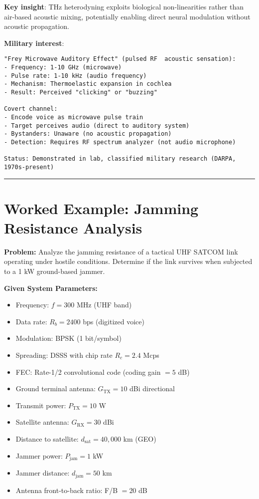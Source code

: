 \textbf{Key insight}: THz heterodyning exploits biological
non-linearities rather than air-based acoustic mixing, potentially
enabling direct neural modulation without acoustic propagation.

\textbf{Military interest}:

\begin{verbatim}
"Frey Microwave Auditory Effect" (pulsed RF  acoustic sensation):
- Frequency: 1-10 GHz (microwave)
- Pulse rate: 1-10 kHz (audio frequency)
- Mechanism: Thermoelastic expansion in cochlea
- Result: Perceived "clicking" or "buzzing"

Covert channel:
- Encode voice as microwave pulse train
- Target perceives audio (direct to auditory system)
- Bystanders: Unaware (no acoustic propagation)
- Detection: Requires RF spectrum analyzer (not audio microphone)

Status: Demonstrated in lab, classified military research (DARPA, 1970s-present)
\end{verbatim}

\begin{center}\rule{0.5\linewidth}{0.5pt}\end{center}

\section{Worked Example: Jamming Resistance Analysis}

\textbf{Problem:} Analyze the jamming resistance of a tactical UHF SATCOM link operating under hostile conditions. Determine if the link survives when subjected to a 1 kW ground-based jammer.

\textbf{Given System Parameters:}
\begin{itemize}
\item Frequency: $f = 300$ MHz (UHF band)
\item Data rate: $R_b = 2400$ bps (digitized voice)
\item Modulation: BPSK (1 bit/symbol)
\item Spreading: DSSS with chip rate $R_c = 2.4$ Mcps
\item FEC: Rate-1/2 convolutional code (coding gain $= 5$ dB)
\item Ground terminal antenna: $G_{\text{TX}} = 10$ dBi directional
\item Transmit power: $P_{\text{TX}} = 10$ W
\item Satellite antenna: $G_{\text{RX}} = 30$ dBi
\item Distance to satellite: $d_{\text{sat}} = 40{,}000$ km (GEO)
\item Jammer power: $P_{\text{jam}} = 1$ kW
\item Jammer distance: $d_{\text{jam}} = 50$ km
\item Antenna front-to-back ratio: F/B $= 20$ dB
\end{itemize}


